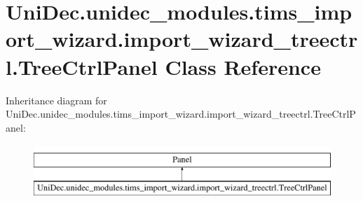 \hypertarget{class_uni_dec_1_1unidec__modules_1_1tims__import__wizard_1_1import__wizard__treectrl_1_1_tree_ctrl_panel}{}\section{Uni\+Dec.\+unidec\+\_\+modules.\+tims\+\_\+import\+\_\+wizard.\+import\+\_\+wizard\+\_\+treectrl.\+Tree\+Ctrl\+Panel Class Reference}
\label{class_uni_dec_1_1unidec__modules_1_1tims__import__wizard_1_1import__wizard__treectrl_1_1_tree_ctrl_panel}
Inheritance diagram for Uni\+Dec.\+unidec\+\_\+modules.\+tims\+\_\+import\+\_\+wizard.\+import\+\_\+wizard\+\_\+treectrl.\+Tree\+Ctrl\+Panel\+:\begin{figure}[H]
\begin{center}
\leavevmode
\includegraphics[height=2.000000cm]{class_uni_dec_1_1unidec__modules_1_1tims__import__wizard_1_1import__wizard__treectrl_1_1_tree_ctrl_panel}
\end{center}
\end{figure}
